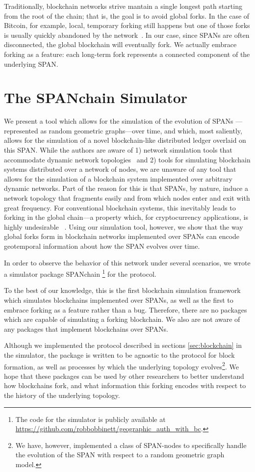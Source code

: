 Traditionally,
blockchain networks strive mantain a single longest path
starting from the root of the chain;
that is,
the goal is to avoid global forks.
In the case of Bitcoin,
for example,
local, temporary forking still happens
but one of those forks is usually quickly abandoned by the network~\cite{decker_2013}.
In our case,
since SPANs are often disconnected,
the global blockchain will eventually fork.
We actually embrace forking as a feature:
each long-term fork represents a connected component of the underlying SPAN.

\section{The SPANchain Simulator}
\label{sec:SPANchain}

We present a tool which allows for the simulation of the evolution of SPANs
---represented as random geometric graphs---over time, and which, most saliently,
allows for the simulation of a novel blockchain-like distributed ledger overlaid
on this SPAN. While the authors are aware of 1) network simulation tools that
accommodate dynamic network topologies~\cite{chaudhary2012study} and
2) tools for simulating blockchain
systems distributed over a network of nodes, we are unaware of any tool that
allows for the simulation of a blockchain system implemented over arbitrary dynamic
networks. Part of the reason for this is that SPANs, by nature, induce a network topology
that fragments easily and from which nodes enter and exit with great frequency. For
conventional blockchain systems, this inevitably leads to forking in the global
chain---a property which, for cryptocurrency applications, is highly undesirable
~\cite{decker_2013,nakamoto2008bitcoin}. Using our simulation tool, however, we show
that the way global forks form in blockchain networks implemented over SPANs can encode
geotemporal information about how the SPAN evolves over time.

In order to observe the behavior of this network under several scenarios,
we wrote a simulator package SPANchain%
\footnote{
	The code for the simulator is publicly available at
	\url{https://github.com/robbobbinett/geographic_auth_with_bc}.
}
for the protocol.

To the best of our knowledge,
this is the first blockchain simulation framework which simulates
blockchains implemented over SPANs, as well as the first
to embrace forking as a feature rather than a bug.
Therefore,
there are no packages which are capable of simulating a forking blockchain.
We also are not aware of any packages that implement blockchains over SPANs.

Although we implemented the protocol described in sections
\ref{sec:blockchain} in the simulator,
the package is written to be agnostic to the protocol for block formation,
as well as processes by which the underlying topology evolves\footnote{We have,
	however, implemented a class of SPAN-nodes to specifically handle
	the evolution of the SPAN with respect to a random geometric graph model.}.
We hope that these packages can be used by other researchers
to better understand how blockchains fork, and what information this forking
encodes with respect to the history of the underlying topology.
